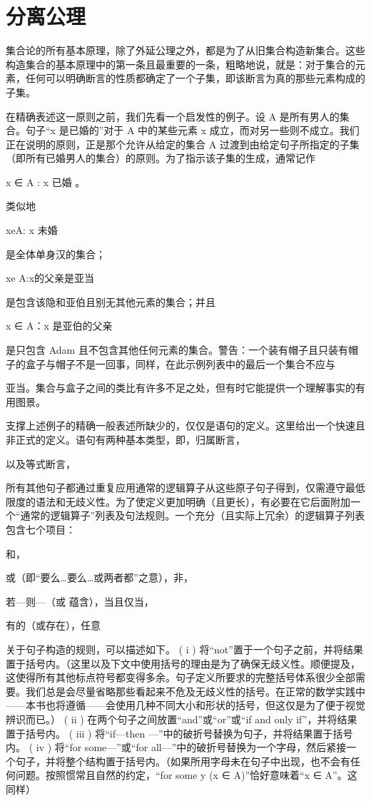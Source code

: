 \documentclass[12pt,a4paper]{ctexbook}
\theoremstyle{definition}
\theoremstyle{remark}
\begin{document}
\chapter{分离公理}

集合论的所有基本原理，除了外延公理之外，都是为了从旧集合构造新集合。这些构造集合的基本原理中的第一条且最重要的一条，粗略地说，就是：对于集合的元素，任何可以明确断言的性质都确定了一个子集，即该断言为真的那些元素构成的子集。

在精确表述这一原则之前，我们先看一个启发性的例子。设 A 是所有男人的集合。句子“x 是已婚的”对于 A 中的某些元素 x 成立，而对另一些则不成立。我们正在说明的原则，正是那个允许从给定的集合 A 过渡到由给定句子所指定的子集（即所有已婚男人的集合）的原则。为了指示该子集的生成，通常记作

{ x ∈ A : x 已婚 }。

类似地

{xeA: x 未婚}

是全体单身汉的集合；

{xe A:x的父亲是亚当}

是包含该隐和亚伯且别无其他元素的集合；并且

{x ∈ A：x 是亚伯的父亲}

是只包含 Adam 且不包含其他任何元素的集合。警告：一个装有帽子且只装有帽子的盒子与帽子不是一回事，同样，在此示例列表中的最后一个集合不应与

亚当。集合与盒子之间的类比有许多不足之处，但有时它能提供一个理解事实的有用图景。

支撑上述例子的精确一般表述所缺少的，仅仅是语句的定义。这里给出一个快速且非正式的定义。语句有两种基本类型，即，归属断言，

以及等式断言，

所有其他句子都通过重复应用通常的逻辑算子从这些原子句子得到，仅需遵守最低限度的语法和无歧义性。为了使定义更加明确（且更长），有必要在它后面附加一个“通常的逻辑算子”列表及句法规则。一个充分（且实际上冗余）的逻辑算子列表包含七个项目：

和，

或（即“要么…要么…或两者都”之意），非，

若—则—（或 蕴含），当且仅当，

有的（或存在），任意

关于句子构造的规则，可以描述如下。 ( i ) 将“not”置于一个句子之前，并将结果置于括号内。（这里以及下文中使用括号的理由是为了确保无歧义性。顺便提及，这使得所有其他标点符号都变得多余。句子定义所要求的完整括号体系很少全部需要。我们总是会尽量省略那些看起来不危及无歧义性的括号。在正常的数学实践中——本书也将遵循——会使用几种不同大小和形状的括号，但这仅是为了便于视觉辨识而已。） ( ii ) 在两个句子之间放置“and”或“or”或“if and only if”，并将结果置于括号内。 ( iii ) 将“if—then —”中的破折号替换为句子，并将结果置于括号内。 ( iv ) 将“for some—”或“for all—”中的破折号替换为一个字母，然后紧接一个句子，并将整个结构置于括号内。（如果所用字母未在句子中出现，也不会有任何问题。按照惯常且自然的约定，“for some y (x ∈ A)”恰好意味着“x ∈ A”。这同样）
\end{document}

